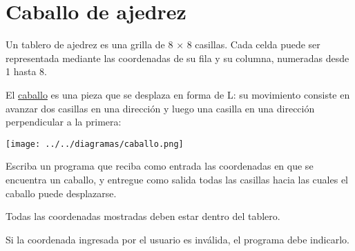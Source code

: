 \section{Caballo de ajedrez}

Un tablero de ajedrez es una grilla de 8 × 8 casillas. Cada celda puede
ser representada mediante las coordenadas de su fila y su columna,
numeradas desde 1 hasta 8.

El \href{http://es.wikipedia.org/wiki/Caballo\_(ajedrez)}{caballo} es
una pieza que se desplaza en forma de L: su movimiento consiste en
avanzar dos casillas en una dirección y luego una casilla en una
dirección perpendicular a la primera:

\texttt{[image: ../../diagramas/caballo.png]}

Escriba un programa que reciba como entrada las coordenadas en que se
encuentra un caballo, y entregue como salida todas las casillas hacia
las cuales el caballo puede desplazarse.

Todas las coordenadas mostradas deben estar dentro del tablero.

Si la coordenada ingresada por el usuario es inválida, el programa debe
indicarlo.
